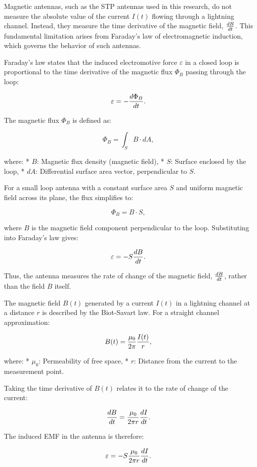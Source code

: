 Magnetic antennas, such as the STP antennas used in this research, do not measure the absolute value of the current 
$I(t)$ flowing through a lightning channel. Instead, they measure the time derivative of the magnetic field, 
${ dB \over dt }$. This fundamental limitation arises from Faraday's law of electromagnetic induction, which governs the behavior of such antennas.

Faraday's law states that the induced electromotive force $\varepsilon$ in a closed loop is proportional to the time 
derivative of the magnetic flux $\Phi_B$ passing through the loop:

$$
\varepsilon = -{ d\Phi_B \over dt }.
$$

The magnetic flux $\Phi_B$ is defined as:

$$
\Phi_B = \int_S B \cdot dA,
$$

where:
\begitems
* $B$: Magnetic flux density (magnetic field),
* $S$: Surface enclosed by the loop,
* $dA$: Differential surface area vector, perpendicular to $S$.
\enditems

For a small loop antenna with a constant surface area $S$ and uniform magnetic field across its plane, the flux simplifies to:

$$
\Phi_B = B \cdot S,
$$

where $B$ is the magnetic field component perpendicular to the loop. Substituting into Faraday's law gives:

$$
\varepsilon = -S { dB \over dt }.
$$

Thus, the antenna measures the rate of change of the magnetic field, ${ dB \over dt }$, rather than the field $B$ itself.



The magnetic field $B(t)$ generated by a current $I(t)$ in a lightning channel at a distance $r$ is described by the Biot-Savart law. For a straight channel approximation:

$$
B(t) = {\mu_0 \over 2\pi} {I(t) \over r},
$$

where:
\begitems
* $\mu_0$: Permeability of free space,
* $r$: Distance from the current to the measurement point.
\enditems

Taking the time derivative of $B(t)$ relates it to the rate of change of the current:

$$
{ dB \over dt } = {\mu_0 \over 2\pi r} { dI \over dt }.
$$

The induced EMF in the antenna is therefore:

$$
\varepsilon = -S {\mu_0 \over 2\pi r} { dI \over dt }.
$$

